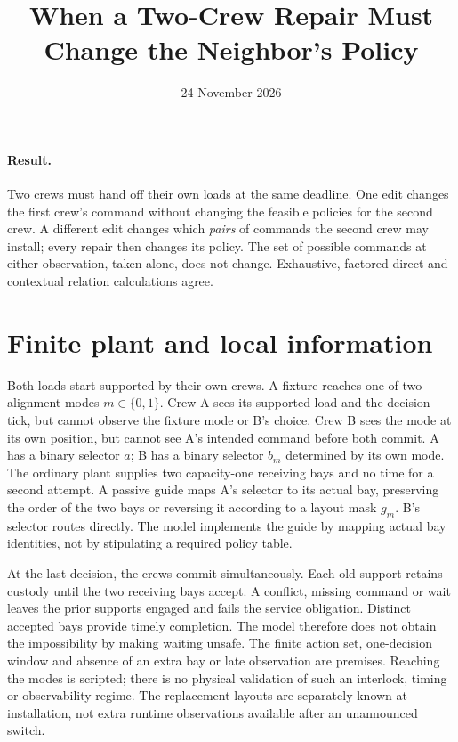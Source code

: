 \documentclass[11pt]{article}
\title{When a Two-Crew Repair Must Change the Neighbor's Policy}
\date{24 November 2026}
\begin{document}
\maketitle

\paragraph{Result.} Two crews must hand off their own loads at the same deadline. One edit changes the first crew's command without changing the feasible policies for the second crew. A different edit changes which \emph{pairs} of commands the second crew may install; every repair then changes its policy. The set of possible commands at either observation, taken alone, does not change. Exhaustive, factored direct and contextual relation calculations agree.

\section{Finite plant and local information}
Both loads start supported by their own crews. A fixture reaches one of two alignment modes \(m\in\{0,1\}\). Crew A sees its supported load and the decision tick, but cannot observe the fixture mode or B's choice. Crew B sees the mode at its own position, but cannot see A's intended command before both commit. A has a binary selector \(a\); B has a binary selector \(b_m\) determined by its own mode. The ordinary plant supplies two capacity-one receiving bays and no time for a second attempt. A passive guide maps A's selector to its actual bay, preserving the order of the two bays or reversing it according to a layout mask \(g_m\). B's selector routes directly. The model implements the guide by mapping actual bay identities, not by stipulating a required policy table.

At the last decision, the crews commit simultaneously. Each old support retains custody until the two receiving bays accept. A conflict, missing command or wait leaves the prior supports engaged and fails the service obligation. Distinct accepted bays provide timely completion. The model therefore does not obtain the impossibility by making waiting unsafe. The finite action set, one-decision window and absence of an extra bay or late observation are premises. Reaching the modes is scripted; there is no physical validation of such an interlock, timing or observability regime. The replacement layouts are separately known at installation, not extra runtime observations available after an unannounced switch.
\end{document}
